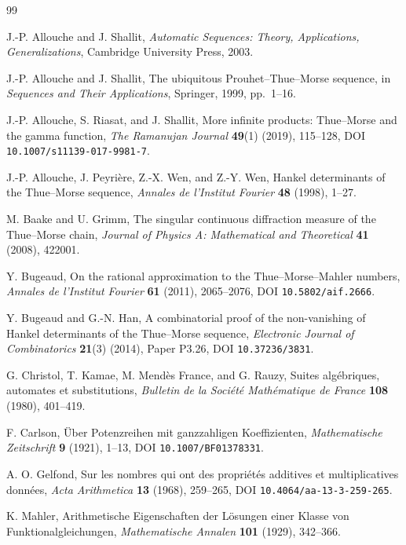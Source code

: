 \documentclass[11pt,oneside]{article}
\theoremstyle{definition}
\theoremstyle{remark}
\begin{document}
\begin{thebibliography}{99}

J.-P. Allouche and J. Shallit,
\emph{Automatic Sequences: Theory, Applications, Generalizations},
Cambridge University Press, 2003.

J.-P. Allouche and J. Shallit,
The ubiquitous Prouhet--Thue--Morse sequence,
in \emph{Sequences and Their Applications}, Springer, 1999, pp.~1--16.

J.-P. Allouche, S. Riasat, and J. Shallit,
More infinite products: Thue--Morse and the gamma function,
\emph{The Ramanujan Journal} \textbf{49}(1) (2019), 115--128,
DOI \nolinkurl{10.1007/s11139-017-9981-7}.

J.-P. Allouche, J. Peyri\`ere, Z.-X. Wen, and Z.-Y. Wen,
Hankel determinants of the Thue--Morse sequence,
\emph{Annales de l'Institut Fourier} \textbf{48} (1998), 1--27.

M. Baake and U. Grimm,
The singular continuous diffraction measure of the Thue--Morse chain,
\emph{Journal of Physics A: Mathematical and Theoretical}
\textbf{41} (2008), 422001.

Y. Bugeaud,
On the rational approximation to the Thue--Morse--Mahler numbers,
\emph{Annales de l'Institut Fourier} \textbf{61} (2011), 2065--2076,
DOI \nolinkurl{10.5802/aif.2666}.

Y. Bugeaud and G.-N. Han,
A combinatorial proof of the non-vanishing of Hankel determinants of the
Thue--Morse sequence,
\emph{Electronic Journal of Combinatorics} \textbf{21}(3) (2014), Paper P3.26,
DOI \nolinkurl{10.37236/3831}.

G. Christol, T. Kamae, M. Mend\`es France, and G. Rauzy,
Suites alg\'ebriques, automates et substitutions,
\emph{Bulletin de la Soci\'et\'e Math\'ematique de France}
\textbf{108} (1980), 401--419.

F. Carlson,
\"Uber Potenzreihen mit ganzzahligen Koeffizienten,
\emph{Mathematische Zeitschrift} \textbf{9} (1921), 1--13,
DOI \nolinkurl{10.1007/BF01378331}.

A. O. Gelfond,
Sur les nombres qui ont des propri\'et\'es additives et multiplicatives donn\'ees,
\emph{Acta Arithmetica} \textbf{13} (1968), 259--265,
DOI \nolinkurl{10.4064/aa-13-3-259-265}.

K. Mahler,
Arithmetische Eigenschaften der L\"osungen einer Klasse von
Funktionalgleichungen,
\emph{Mathematische Annalen} \textbf{101} (1929), 342--366.


\end{thebibliography}
\end{document}
